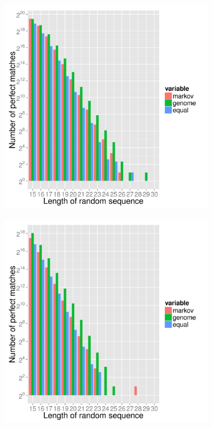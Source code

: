 \documentclass{article}
\begin{document}
\begin{figure}[t]
\begin{subfigure}{.5\textwidth}
      \caption{}
      \label{fig:mm10_mapped_perfect}
   \end{subfigure}  
   \begin{subfigure}{.5\columnwidth}
      \centering
      \includegraphics[width=.9\textwidth,natwidth=100,natheight=100]{danRer7_perfect_mapped_1000000.pdf}
      \caption{}
      \label{fig:danRer7_mapped_perfect}
   \end{subfigure}%
   \begin{subfigure}{.5\columnwidth}
      \centering
      \includegraphics[width=.9\textwidth,natwidth=100,natheight=100]{ce10_perfect_mapped_1000000.pdf}
      \caption{}
      \label{fig:ce10_mapped_perfect}
   \end{subfigure}
   \caption{}
   \label{fig:mapped_perfect_statistic}
\end{figure}
\end{document}
